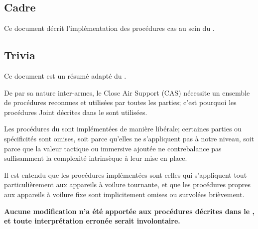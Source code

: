 \thispagestyle{default}

%

\subsection*{Cadre}

\vfil

Ce document décrit l'implémentation des procédures \acrfull{cas} au sein du \rgt{}.

\vfil

\subsection*{Trivia}

\vfil

Ce document est un résumé adapté du \jp{}.

\vfil

De par sa nature inter-armes, le Close Air Support (CAS) nécessite un ensemble de procédures reconnues et utilisées par toutes les parties; c'est pourquoi les procédures Joint décrites dans le \jp{} sont utilisées.

\vfil

Les procédures du \jp{} sont implémentées de manière libérale; certaines parties ou spécificités sont omises, soit parce qu'elles ne s'appliquent pas à notre niveau, soit parce que la valeur tactique ou immersive ajoutée ne contrebalance pas suffisamment la complexité intrinsèque à leur mise en place.

\vfil

Il est entendu que les procédures implémentées sont celles qui s'appliquent tout particulièrement aux appareils à voilure tournante, et que les procédures propres aux appareils à voilure fixe sont implicitement omises ou survolées brièvement.

\vfil

\textbf{Aucune modification n'a été apportée aux procédures décrites dans le \jp{}, et toute interprétation erronée serait involontaire.}